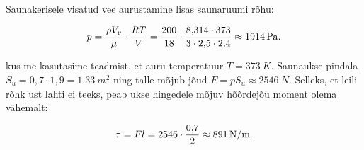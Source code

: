 \documentclass[10pt]{article}
\begin{document}
\solu
Saunakerisele visatud vee aurustamine lisas saunaruumi rõhu: 

\[ p = {\rho V_v  \over \mu} \cdot {RT\over V} = {200 \over 18} \cdot {8,\!314 \cdot 373 \over 3\cdot2,\!5\cdot2,\!4} \approx \SI{1914}{Pa}. \] 

kus me kasutasime teadmist, et auru temperatuur $T=\SI{373}{K}$. Saunaukse pindala $S_u = 0,\!7 \cdot 1,\!9 = \SI{1,33}{m^2}$ ning talle mõjub jõud $F = p S_u \approx \SI{2546}{N}$.
Selleks, et leili rõhk ust lahti ei teeks, peab ukse hingedele mõjuv hõõrdejõu moment olema vähemalt:

\[ \tau = { F l } = { 2546 \cdot {0,\!7 \over 2 } } \approx \SI{891}{N/m}.\]
\probend
\bigskip

\end{document}
